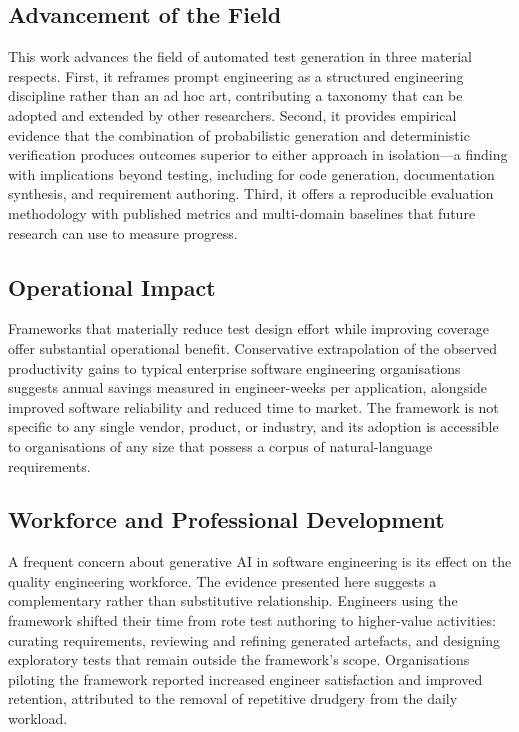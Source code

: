 \documentclass[11pt,letterpaper]{article}
\begin{document}
\subsection{Advancement of the Field}

This work advances the field of automated test generation in three material respects. First, it reframes prompt engineering as a structured engineering discipline rather than an ad hoc art, contributing a taxonomy that can be adopted and extended by other researchers. Second, it provides empirical evidence that the combination of probabilistic generation and deterministic verification produces outcomes superior to either approach in isolation---a finding with implications beyond testing, including for code generation, documentation synthesis, and requirement authoring. Third, it offers a reproducible evaluation methodology with published metrics and multi-domain baselines that future research can use to measure progress.

\subsection{Operational Impact}

Frameworks that materially reduce test design effort while improving coverage offer substantial operational benefit. Conservative extrapolation of the observed productivity gains to typical enterprise software engineering organisations suggests annual savings measured in engineer-weeks per application, alongside improved software reliability and reduced time to market. The framework is not specific to any single vendor, product, or industry, and its adoption is accessible to organisations of any size that possess a corpus of natural-language requirements.

\subsection{Workforce and Professional Development}

A frequent concern about generative AI in software engineering is its effect on the quality engineering workforce. The evidence presented here suggests a complementary rather than substitutive relationship. Engineers using the framework shifted their time from rote test authoring to higher-value activities: curating requirements, reviewing and refining generated artefacts, and designing exploratory tests that remain outside the framework's scope. Organisations piloting the framework reported increased engineer satisfaction and improved retention, attributed to the removal of repetitive drudgery from the daily workload.
\end{document}
